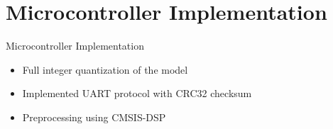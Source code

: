 \documentclass{beamer}
\begin{document}
\section{Microcontroller Implementation}
\begin{frame}{Microcontroller Implementation}
	\begin{itemize}
		\item<2->Full integer quantization of the model
		\item<3->Implemented UART protocol with CRC32 checksum
		\item<4->Preprocessing using CMSIS-DSP
	\end{itemize}
	\vspace{10mm}

\end{frame}
\end{document}
